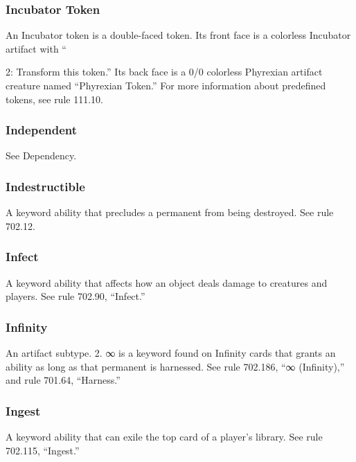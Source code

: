 {{{{{{{{{{{{{{{{\subsubsection*{Incubator Token}

An Incubator token is a double-faced token. Its front face is a colorless Incubator artifact with “{2: Transform this token.” Its back face is a 0/0 colorless Phyrexian artifact creature named “Phyrexian Token.” For more information about predefined tokens, see rule 111.10.

\subsubsection*{Independent}

See Dependency.

\subsubsection*{Indestructible}

A keyword ability that precludes a permanent from being destroyed. See rule 702.12.

\subsubsection*{Infect}

A keyword ability that affects how an object deals damage to creatures and players. See rule 702.90, “Infect.”

\subsubsection*{Infinity}

An artifact subtype.
2. ∞ is a keyword found on Infinity cards that grants an ability as long as that permanent is harnessed. See rule 702.186, “∞ (Infinity),” and rule 701.64, “Harness.”

\subsubsection*{Ingest}

A keyword ability that can exile the top card of a player’s library. See rule 702.115, “Ingest.”

}}}}}}}}}}}}}}}}}
